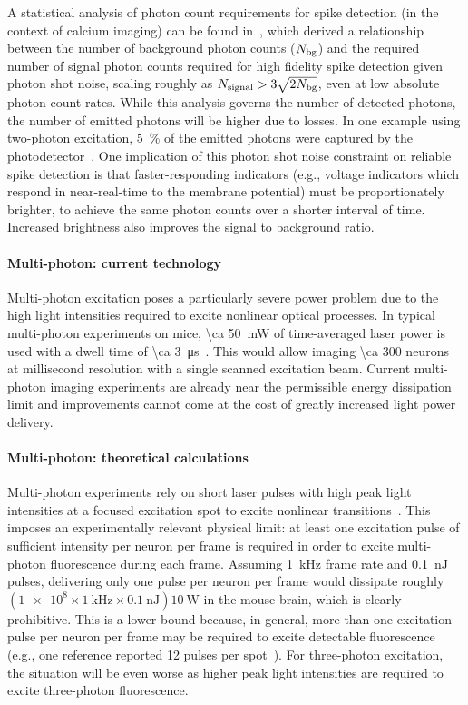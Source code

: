 A statistical analysis of photon count requirements for spike detection (in the context of calcium imaging) can be found in~\cite{wilt13}, which derived a relationship between the number of background photon counts ($N_{\text{\scriptsize bg}}$) and the required number of signal photon counts required for high fidelity spike detection given photon shot noise, scaling roughly as $N_{\text{\scriptsize signal}} > 3\sqrt{2N_{\text{\scriptsize bg}}}$, even at low absolute photon count rates.
While this analysis governs the number of detected photons, the number of emitted photons will be higher due to losses.
In one example using two-photon excitation, \SI{5}{\percent} of the emitted photons were captured by the photodetector~\cite{kim99}. One implication of this photon shot noise constraint on reliable spike detection is that faster-responding indicators (e.g., voltage indicators which respond in near-real-time to the membrane potential) must be proportionately brighter, to achieve the same photon counts over a shorter interval of time. Increased brightness also improves the signal to background ratio.

\paragraph{Multi-photon: current technology}
Multi-photon excitation poses a particularly severe power problem due to the high light intensities required to excite nonlinear optical processes.
In typical multi-photon experiments on mice, \SI{\ca 50}{\milli\watt} of time-averaged laser power is used with a dwell time of \SI{\ca 3}{\micro\second}~\cite{wilson07}.
This would allow imaging \num{\ca 300} neurons at millisecond resolution with a single scanned excitation beam.
Current multi-photon imaging experiments are already near the permissible energy dissipation limit and improvements cannot come at the cost of greatly increased light power delivery.

\paragraph{Multi-photon: theoretical calculations}
Multi-photon experiments rely on short laser pulses with high peak light intensities at a focused excitation spot to excite nonlinear transitions~\cite{kim99}.
This imposes an experimentally relevant physical limit: at least one excitation pulse of sufficient intensity per neuron per frame is required in order to excite multi-photon fluorescence during each frame.
Assuming \SI{1}{\kilo\hertz} frame rate and \SI{0.1}{\nano\joule} pulses, delivering only one pulse per neuron per frame would dissipate roughly $\left(\num{1e8}\times\SI{1}{\kilo\hertz}\times\SI{0.1}{\nano\joule}\right) \SI{10}{\watt}$ in the mouse brain, which is clearly prohibitive.
This is a lower bound because, in general, more than one excitation pulse per neuron per frame may be required to excite detectable fluorescence (e.g., one reference reported 12 pulses per spot~\cite{kim99}).
For three-photon excitation, the situation will be even worse as higher peak light intensities are required to excite three-photon fluorescence.

